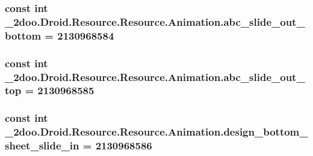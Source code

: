 \hypertarget{class__2doo_1_1_droid_1_1_resource_1_1_animation_351607b447d7a765fcf650e60e415025}{
\subsubsection[{abc\_\-slide\_\-out\_\-bottom}]{\setlength{\rightskip}{0pt plus 5cm}const int \_\-2doo.Droid.Resource.Resource.Animation.abc\_\-slide\_\-out\_\-bottom = 2130968584}}
\label{class__2doo_1_1_droid_1_1_resource_1_1_animation_351607b447d7a765fcf650e60e415025}


\hypertarget{class__2doo_1_1_droid_1_1_resource_1_1_animation_bfa6f1c5461e58c09df99129e27398f0}{
\subsubsection[{abc\_\-slide\_\-out\_\-top}]{\setlength{\rightskip}{0pt plus 5cm}const int \_\-2doo.Droid.Resource.Resource.Animation.abc\_\-slide\_\-out\_\-top = 2130968585}}
\label{class__2doo_1_1_droid_1_1_resource_1_1_animation_bfa6f1c5461e58c09df99129e27398f0}


\hypertarget{class__2doo_1_1_droid_1_1_resource_1_1_animation_9f0461b23bcaf65df92e76a9ba27099e}{
\subsubsection[{design\_\-bottom\_\-sheet\_\-slide\_\-in}]{\setlength{\rightskip}{0pt plus 5cm}const int \_\-2doo.Droid.Resource.Resource.Animation.design\_\-bottom\_\-sheet\_\-slide\_\-in = 2130968586}}
\label{class__2doo_1_1_droid_1_1_resource_1_1_animation_9f0461b23bcaf65df92e76a9ba27099e}


